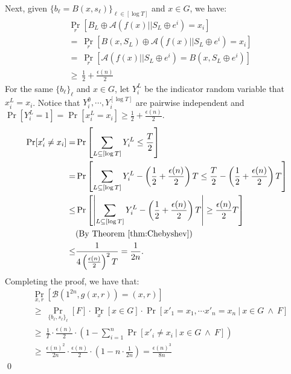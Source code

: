 \documentclass[12pt]{tufte-book}
\newcommand{\ma}{\mathcal{A}}
\begin{document}
Next, given $\{ b_\ell = B(x,s_\ell) \}_{\ell \in [\log T]}$ and $x\in G$, we have:
\begin{align*}
&\Pr_{r} \left[  B_L \oplus \ma(f(x) || S_L \oplus e^i) = x_i \right] \\
&=~ \Pr_{r} \left[ B(x,S_L) \oplus \ma(f(x) || S_L \oplus e^i) = x_i \right]\\
&=~ \Pr_{r} \left[ \ma(f(x) || S_L \oplus e^i) =  B(x,S_L \oplus e^i) \right]\\
&\geq~ \frac{1}{2} + \frac{\epsilon(n)}{2}
\end{align*}
For the same $\{ b_\ell \}_\ell$ and $x\in G$, let $Y_i^L$ be the indicator random variable that $x_i^L = x_i$.
Notice that $Y_i^\emptyset, \cdots, Y_i^{[\log T]}$ are pairwise independent and $\Pr[Y_i^L=1] = \Pr[x_i^L = x_i] \geq \frac{1}{2} + \frac{\epsilon(n)}{2}$.
\begin{align*}
\Pr[x'_i \neq x_i] =& \Pr\left[\sum_{L \subseteq [\log T]} Y_i^L \leq \frac{T}{2} \right]\\
=& \Pr\left[\sum_{L \subseteq [\log T]} Y_i^L - \left(\frac{1}{2} +  \frac{\epsilon(n)}{2} \right)T \leq \frac{T}{2} - \left(\frac{1}{2} +  \frac{\epsilon(n)}{2} \right)T \right]\\
\leq& \Pr\left[ \left| \sum_{L \subseteq [\log T]} Y_i^L - \left(\frac{1}{2} +  \frac{\epsilon(n)}{2} \right)T \right| \geq \frac{\epsilon(n)}{2} T \right]\\
& \text{(By Theorem~\ref{thm:Chebyshev})}\\
\leq& \frac{1}{4\left( \frac{\epsilon(n)}{2}\right)^2T} = \frac{1}{2n}.
\end{align*}
Completing the proof, we have that:
\begin{align*}
& \Pr_{x,r}[\mathcal{B}(1^{2n}, g(x,r)) = (x,r)]\\
&\geq~  \Pr_{\{ b_\ell, s_\ell \}_\ell}\left[ F \right] \cdot  \Pr_x [x \in G] \cdot \Pr[x'_1 = x_1, \cdots x'_n = x_n ~|~ x \in G ~\wedge~ F]\\
&\geq~ \frac{1}{T} \cdot \frac{\epsilon(n)}{2} \cdot \left(1- \sum_{i=1}^n\Pr[x'_i \neq x_i ~|~  x \in G ~\wedge~ F]\right)\\
&\geq~ \frac{\epsilon(n)^2}{2n} \cdot \frac{\epsilon(n)}{2} \cdot \left(1- n \cdot\frac{1}{2n} \right) =  \frac{\epsilon(n)^3}{8n}
\end{align*}
\qed
\end{document}
